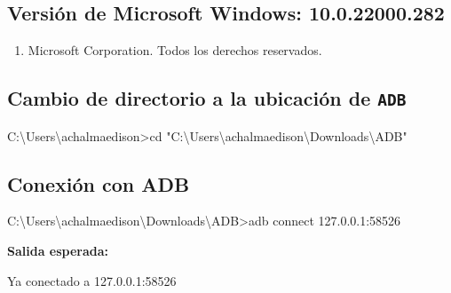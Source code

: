 \documentclass[
  doc,
  floatsintext,
  longtable,
  a4paper,
  nolmodern,
  notxfonts,
  notimes,
  12pt,
  colorlinks=true,linkcolor=blue,citecolor=blue,urlcolor=blue]{apa7}
\newenvironment{Shaded}{\begin{snugshade}}{\end{snugshade}}
\newcommand{\ExtensionTok}[1]{\textcolor[rgb]{0.00,0.23,0.31}{#1}}
\newcommand{\NormalTok}[1]{\textcolor[rgb]{0.00,0.23,0.31}{#1}}
\newcommand{\OperatorTok}[1]{\textcolor[rgb]{0.37,0.37,0.37}{#1}}
\newcommand{\StringTok}[1]{\textcolor[rgb]{0.13,0.47,0.30}{#1}}
\providecommand{\tightlist}{%
  \setlength{\itemsep}{0pt}\setlength{\parskip}{0pt}}
\begin{document}
\subsection{Versión de Microsoft Windows:
10.0.22000.282}\label{versiuxf3n-de-microsoft-windows-10.0.22000.282}

\begin{enumerate}
\def\labelenumi{(\alph{enumi})}
\setcounter{enumi}{2}
\tightlist
\item
  Microsoft Corporation. Todos los derechos reservados.
\end{enumerate}

\subsection{\texorpdfstring{Cambio de directorio a la ubicación de
\texttt{ADB}}{Cambio de directorio a la ubicación de ADB}}\label{cambio-de-directorio-a-la-ubicaciuxf3n-de-adb}

\begin{Shaded}
\begin{Highlighting}[]

\ExtensionTok{C:\textbackslash{}Users\textbackslash{}achalmaedison}\OperatorTok{\textgreater{}}\NormalTok{cd }\StringTok{"C:\textbackslash{}Users\textbackslash{}achalmaedison\textbackslash{}Downloads\textbackslash{}ADB"}
\end{Highlighting}
\end{Shaded}

\subsection{Conexión con ADB}\label{conexiuxf3n-con-adb}

\begin{Shaded}
\begin{Highlighting}[]

\ExtensionTok{C:\textbackslash{}Users\textbackslash{}achalmaedison\textbackslash{}Downloads\textbackslash{}ADB}\OperatorTok{\textgreater{}}\NormalTok{adb connect 127.0.0.1:58526}
\end{Highlighting}
\end{Shaded}

\textbf{Salida esperada:}

\begin{Shaded}
\begin{Highlighting}[]

\ExtensionTok{Ya}\NormalTok{ conectado a 127.0.0.1:58526}
\end{Highlighting}
\end{Shaded}
\end{document}

